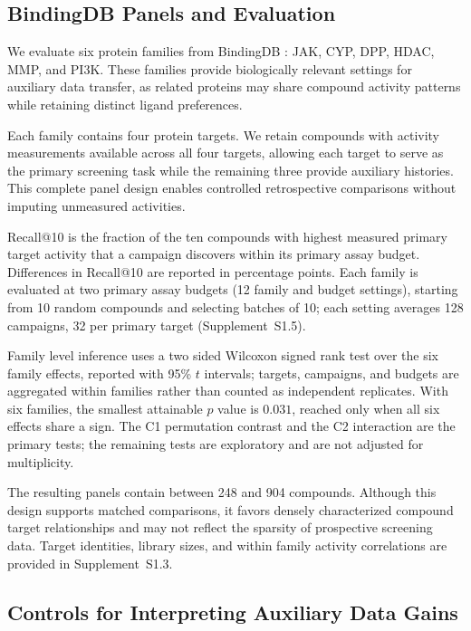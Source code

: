 \documentclass[10pt,letterpaper,runningheads]{llncs}
\begin{document}
\subsection{BindingDB Panels and Evaluation}
\label{sec:setup}

We evaluate six protein families from BindingDB
\cite{bindingdb2016,liu2025bindingdb}: JAK, CYP, DPP, HDAC, MMP, and
PI3K. These families provide biologically relevant
settings for auxiliary data transfer, as related
proteins may share compound activity patterns while
retaining distinct ligand preferences.

Each family contains four protein targets. We retain
compounds with activity measurements available across
all four targets, allowing each target to serve as the
primary screening task while the remaining three
provide auxiliary histories. This complete panel
design enables controlled retrospective comparisons
without imputing unmeasured activities.

Recall@10 is the fraction of the ten compounds with highest
measured primary target activity that a campaign discovers within its
primary assay budget. Differences in Recall@10 are reported in
percentage points. Each family is evaluated at two primary assay
budgets (12 family and budget settings), starting from 10 random
compounds and selecting batches of 10; each setting averages 128
campaigns, 32 per primary target (Supplement~S1.5).

Family level inference uses a two sided Wilcoxon signed rank test over
the six family effects, reported with 95\% $t$ intervals; targets,
campaigns, and budgets are aggregated within families rather than
counted as independent replicates. With six families, the smallest
attainable $p$ value is $0.031$, reached only when all six effects share
a sign. The C1 permutation contrast and the C2 interaction are the
primary tests; the remaining tests are exploratory and are not adjusted
for multiplicity.

The resulting panels contain between 248 and 904
compounds. Although this design supports matched
comparisons, it favors densely characterized
compound target relationships and may not reflect
the sparsity of prospective screening data.
Target identities, library sizes, and within family
activity correlations are provided in Supplement~S1.3.



\subsection{Controls for Interpreting Auxiliary Data Gains}
\label{sec:method-controls}
\end{document}
